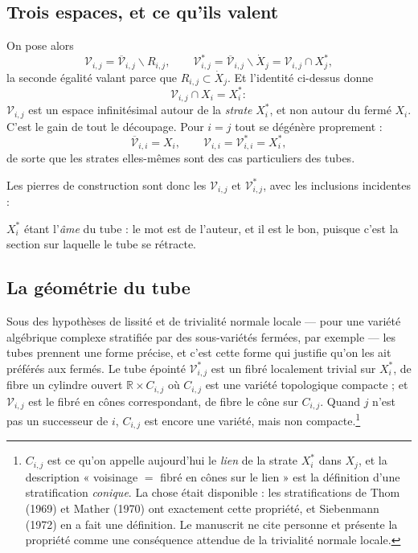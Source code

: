\documentclass[11pt,a4paper]{article}
\begin{document}
\subsection*{Trois espaces, et ce qu'ils valent}

On pose alors
\[
  \mathcal{V}_{i,j} = \overline{\mathcal{V}}_{i,j} \smallsetminus R_{i,j},
  \qquad
  \mathcal{V}^{*}_{i,j} = \overline{\mathcal{V}}_{i,j} \smallsetminus \dot{X}_{j}
  = \mathcal{V}_{i,j} \cap X_{j}^{*},
\]
la seconde égalité valant parce que $R_{i,j} \subset \dot{X}_{j}$. Et
l'identité ci-dessus donne
\[
  \mathcal{V}_{i,j} \cap X_{i} = X_{i}^{*} :
\]
$\mathcal{V}_{i,j}$ est un espace infinitésimal autour de la \emph{strate}
$X_{i}^{*}$, et non autour du fermé $X_{i}$. C'est le gain de tout le découpage.
Pour $i = j$ tout se dégénère proprement :
\[
  \overline{\mathcal{V}}_{i,i} = X_{i}, \qquad
  \mathcal{V}_{i,i} = \mathcal{V}^{*}_{i,i} = X_{i}^{*},
\]
de sorte que les strates elles-mêmes sont des cas particuliers des tubes.

Les pierres de construction sont donc les $\mathcal{V}_{i,j}$ et
$\mathcal{V}^{*}_{i,j}$, avec les inclusions incidentes :


$X_{i}^{*}$ étant l'\emph{âme} du tube : le mot est de l'auteur, et il est le
bon, puisque c'est la section sur laquelle le tube se rétracte.

\subsection*{La géométrie du tube}

Sous des hypothèses de lissité et de trivialité normale locale — pour une variété
algébrique complexe stratifiée par des sous-variétés fermées, par exemple — les
tubes prennent une forme précise, et c'est cette forme qui justifie qu'on les ait
préférés aux fermés. Le tube épointé $\mathcal{V}^{*}_{i,j}$ est un fibré
localement trivial sur $X_{i}^{*}$, de fibre un cylindre ouvert
$\mathbb{R} \times C_{i,j}$ où $C_{i,j}$ est une variété topologique compacte ;
et $\mathcal{V}_{i,j}$ est le fibré en cônes correspondant, de fibre le cône sur
$C_{i,j}$. Quand $j$ n'est pas un successeur de $i$, $C_{i,j}$ est encore une
variété, mais non compacte.\footnote{$C_{i,j}$ est ce qu'on appelle aujourd'hui
le \emph{lien} de la strate $X_{i}^{*}$ dans $X_{j}$, et la description « voisinage
$=$ fibré en cônes sur le lien » est la définition d'une stratification
\emph{conique}. La chose était disponible : les stratifications de
Thom (1969) et Mather (1970) ont exactement cette propriété, et Siebenmann (1972)
en a fait une définition. Le manuscrit ne cite personne et présente la propriété
comme une conséquence attendue de la trivialité normale locale.}
\end{document}
